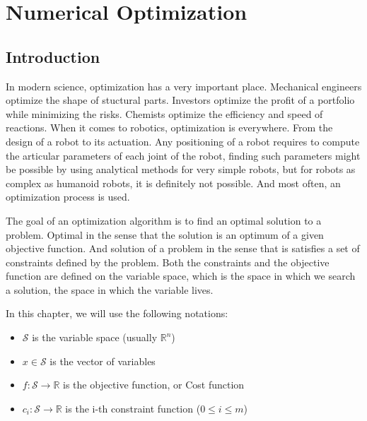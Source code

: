 
\chapter{Numerical Optimization}
\label{chapter:optimization}

\ifpdf
    \graphicspath{{Chapter1/Figs/Raster/}{Chapter1/Figs/PDF/}{Chapter1/Figs/}}
\else
    \graphicspath{{Chapter1/Figs/Vector/}{Chapter1/Figs/}}
\fi


\section{Introduction}
In modern science, optimization has a very important place. Mechanical engineers
optimize the shape of stuctural parts. Investors optimize the profit of a
portfolio while minimizing the risks. Chemists optimize the efficiency and speed
of reactions. When it comes to robotics, optimization is everywhere. From the
design of a robot to its actuation. Any positioning of a robot requires to
compute the articular parameters of each joint of the robot, finding such
parameters might be possible by using analytical methods for very simple robots,
but for robots as complex as humanoid robots, it is definitely not possible. And
most often, an optimization process is used.

The goal of an optimization algorithm is to find an optimal solution to a
problem. Optimal in the sense that the solution is an optimum of a given
objective function. And solution of a problem in the sense that is satisfies a
set of constraints defined by the problem. Both the constraints and the
objective function are defined on the variable space, which is the space in
which we search a solution, the space in which the variable lives.

In this chapter, we will use the following notations:
\begin{itemize}
  \item $\mathcal{S}$ is the variable space (usually $\mathbb{R}^n$)
  \item $x\in\mathcal{S}$ is the vector of variables
  \item $f:\mathcal{S}\rightarrow\mathbb{R}$ is the objective function, or Cost function
  \item $c_i:\mathcal{S}\rightarrow\mathbb{R}$ is the i-th constraint function
    ($0\leq i \leq m$)
\end{itemize}

